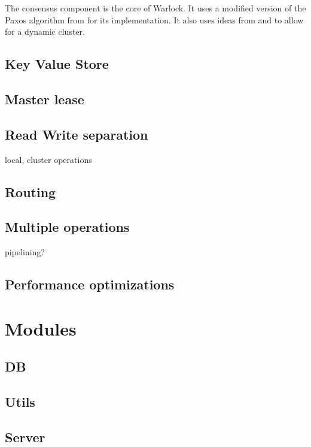 The consensus component is the core of Warlock. It uses a modified version of 
the Paxos algorithm from \citet{Robbert2011} for its implementation. It also
uses ideas from \citet{LamportSP08} and \citet{LamportMZ10} to allow for
a dynamic cluster.

\subsection{Key Value Store}

\subsection{Master lease}

\subsection{Read Write separation}

local, cluster operations

\subsection{Routing}

\subsection{Multiple operations}

pipelining?

\subsection{Performance optimizations}

\section{Modules}

\subsection{DB}

\subsection{Utils}

\subsection{Server}

